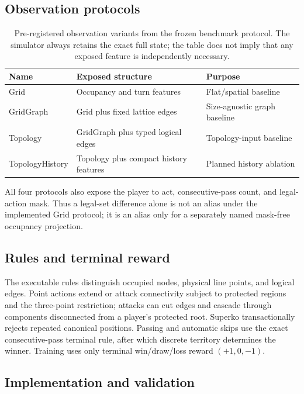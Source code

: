 \documentclass[10pt,letterpaper]{article}
\begin{document}
\subsection{Observation protocols}

\begin{table}[t]
  \centering
  \caption{Pre-registered observation variants from the frozen benchmark
  protocol. The simulator always retains the exact full state; the table does
  not imply that any exposed feature is independently necessary.}
  \label{tab:observations}
  \begin{tabular}{lll}
    \toprule
    Name & Exposed structure & Purpose \\
    \midrule
    Grid & Occupancy and turn features & Flat/spatial baseline \\
    GridGraph & Grid plus fixed lattice edges & Size-agnostic graph baseline \\
    Topology & GridGraph plus typed logical edges & Topology-input baseline \\
    TopologyHistory & Topology plus compact history features & Planned history ablation \\
    \bottomrule
  \end{tabular}
\end{table}

All four protocols also expose the player to act, consecutive-pass count, and
legal-action mask. Thus a legal-set difference alone is not an alias under the
implemented Grid protocol; it is an alias only for a separately named
mask-free occupancy projection.

\subsection{Rules and terminal reward}

The executable rules distinguish occupied nodes, physical line points, and
logical edges. Point actions extend or attack connectivity subject to protected
regions and the three-point restriction; attacks can cut edges and cascade
through components disconnected from a player's protected root. Superko
transactionally rejects repeated canonical positions. Passing and automatic
skips use the exact consecutive-pass terminal rule, after which discrete
territory determines the winner. Training uses only terminal win/draw/loss
reward $(+1,0,-1)$.

\subsection{Implementation and validation}
\end{document}

